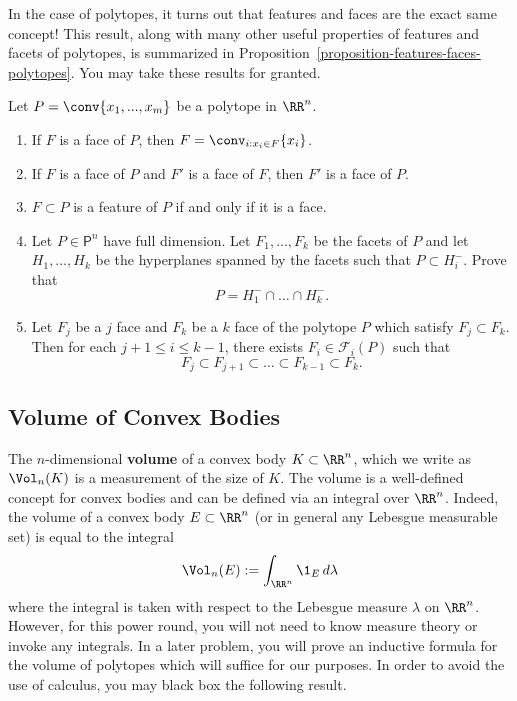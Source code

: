 \documentclass[11pt]{article}
\begin{document}
In the case of polytopes, it turns out that features and faces are the exact same concept! This result, along with many other useful properties of features and facets of polytopes, is summarized in Proposition~\ref{proposition-features-faces-polytopes}. You may take these results for granted.  
\begin{prop} \label{proposition-features-faces-polytopes}
    Let $P = \conv \{x_1, ..., x_m\}$ be a polytope in $\RR^n$. 
    \begin{enumerate}[label = (\alph*)] 
        \item If $F$ is a face of $P$, then $F = \conv_{i : x_i \in F} \{x_i\}$. 
        \item If $F$ is a face of $P$ and $F'$ is a face of $F$, then $F'$ is a face of $P$. 
        \item $F \subset P$ is a feature of $P$ if and only if it is a face. 
        \item Let $P \in \mathsf{P}^n$ have full dimension. Let $F_1, \ldots, F_k$ be the facets of $P$ and let $H_1, \ldots, H_k$ be the hyperplanes spanned by the facets such that $P \subset H_i^-$. Prove that 
        \[
            P = H_1^- \cap \ldots \cap H_k^-.
        \]
        \item Let $F_j$ be a $j$ face and $F_k$ be a $k$ face of the polytope $P$ which satisfy $F_j \subset F_k$. Then for each $j+1 \leq i \leq k-1$, there exists $F_i \in \mathcal{F}_i(P)$ such that 
        \[
            F_j \subset F_{j+1} \subset \ldots \subset F_{k-1} \subset F_k.
        \]
    \end{enumerate}
\end{prop}

\subsection{Volume of Convex Bodies}

The $n$-dimensional \textbf{volume} of a convex body $K \subset \RR^n$, which we write as $\Vol_n(K)$ is a measurement of the size of $K$. The volume is a well-defined concept for convex bodies and can be defined via an integral over $\RR^n$. Indeed, the volume of a convex body $E \subset \RR^n$ (or in general any Lebesgue measurable set) is equal to the integral
\[
    \Vol_n(E) := \int_{\RR^n} \1_E \, d\lambda 
\] 
where the integral is taken with respect to the Lebesgue measure $\lambda$ on $\RR^n$. However, for this power round, you will not need to know measure theory or invoke any integrals. In a later problem, you will prove an inductive formula for the volume of polytopes which will suffice for our purposes. In order to avoid the use of calculus, you may black box the following result. 
\end{document}
